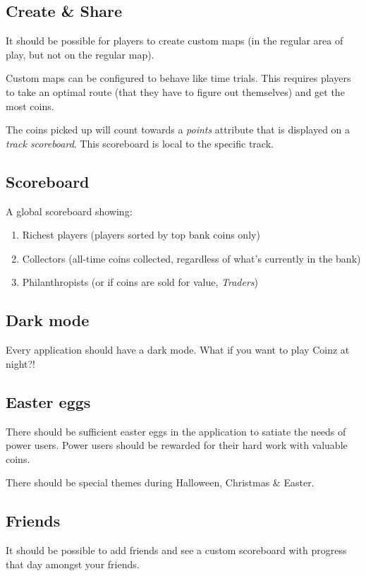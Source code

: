 \documentclass[a4paper]{article}
\begin{document}
\subsection{Create \& Share}
It should be possible for players to create custom maps (in the regular area of play, but not on the regular map).

Custom maps can be configured to behave like time trials. This requires players to take an optimal route (that they have to figure out themselves) and get the most coins.

The coins picked up will count towards a \emph{points} attribute that is displayed on a \emph{track scoreboard}. This scoreboard is local to the specific track.

\subsection{Scoreboard}
A global scoreboard showing:
\begin{enumerate}
    \item Richest players (players sorted by top bank coins only)
    \item Collectors (all-time coins collected, regardless of what's currently in the bank)
    \item Philanthropists (or if coins are sold for value, \emph{Traders})
\end{enumerate}

\subsection{Dark mode}

Every application should have a dark mode. What if you want to play Coinz at night?!

\subsection{Easter eggs}

There should be sufficient easter eggs in the application to satiate the needs of power users. Power users should be rewarded for their hard work with valuable coins.

There should be special themes during Halloween, Christmas \& Easter.

\subsection{Friends}

It should be possible to add friends and see a custom scoreboard with progress that day amongst your friends.
\end{document}
